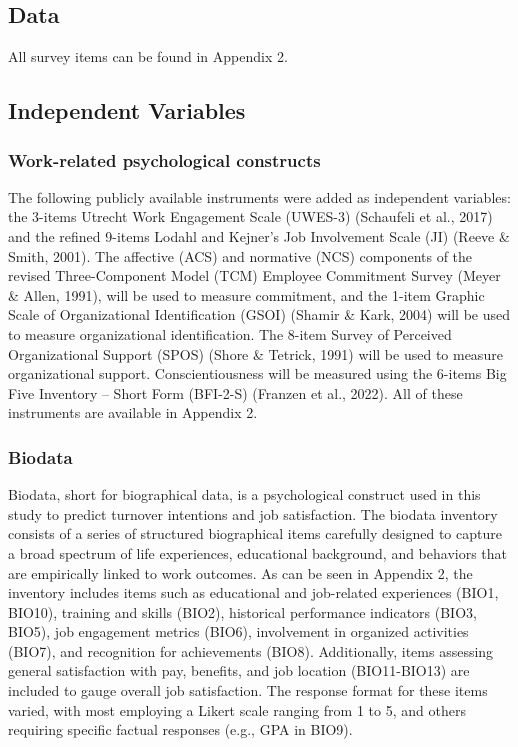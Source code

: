 \documentclass[
  man]{apa7}
\begin{document}
\hypertarget{data-1}{%
\subsection{Data}\label{data-1}}

All survey items can be found in Appendix 2.

\hypertarget{independent-variables-1}{%
\subsection{Independent Variables}\label{independent-variables-1}}

\hypertarget{work-related-psychological-constructs}{%
\subsubsection{Work-related psychological constructs}\label{work-related-psychological-constructs}}

The following publicly available instruments were added as independent variables: the 3-items Utrecht Work Engagement Scale (UWES-3) (Schaufeli et al., 2017) and the refined 9-items Lodahl and Kejner's Job Involvement Scale (JI) (Reeve \& Smith, 2001). The affective (ACS) and normative (NCS) components of the revised Three-Component Model (TCM) Employee Commitment Survey (Meyer \& Allen, 1991), will be used to measure commitment, and the 1-item Graphic Scale of Organizational Identification (GSOI) (Shamir \& Kark, 2004) will be used to measure organizational identification. The 8-item Survey of Perceived Organizational Support (SPOS) (Shore \& Tetrick, 1991) will be used to measure organizational support. Conscientiousness will be measured using the 6-items Big Five Inventory -- Short Form (BFI-2-S) (Franzen et al., 2022). All of these instruments are available in Appendix 2.

\hypertarget{biodata}{%
\subsubsection{Biodata}\label{biodata}}

Biodata, short for biographical data, is a psychological construct used in this study to predict turnover intentions and job satisfaction. The biodata inventory consists of a series of structured biographical items carefully designed to capture a broad spectrum of life experiences, educational background, and behaviors that are empirically linked to work outcomes. As can be seen in Appendix 2, the inventory includes items such as educational and job-related experiences (BIO1, BIO10), training and skills (BIO2), historical performance indicators (BIO3, BIO5), job engagement metrics (BIO6), involvement in organized activities (BIO7), and recognition for achievements (BIO8). Additionally, items assessing general satisfaction with pay, benefits, and job location (BIO11-BIO13) are included to gauge overall job satisfaction. The response format for these items varied, with most employing a Likert scale ranging from 1 to 5, and others requiring specific factual responses (e.g., GPA in BIO9).
\end{document}
